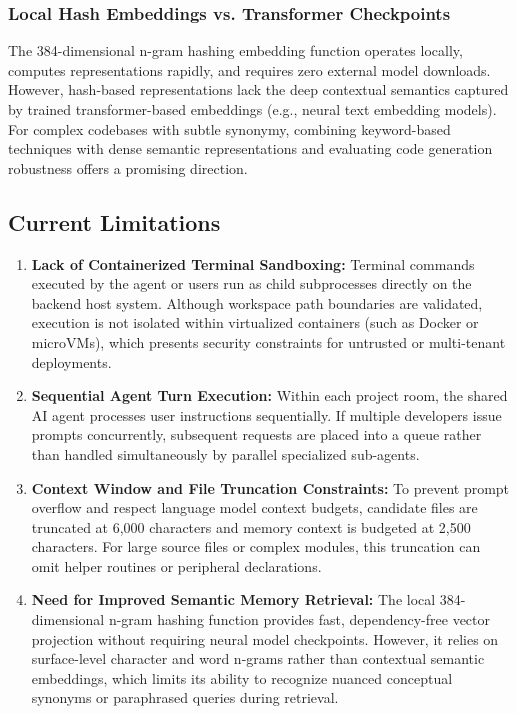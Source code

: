 \documentclass[conference]{IEEEtran}
\begin{document}
\subsubsection{Local Hash Embeddings vs. Transformer Checkpoints}
The 384-dimensional n-gram hashing embedding function operates locally, computes representations rapidly, and requires zero external model downloads. However, hash-based representations lack the deep contextual semantics captured by trained transformer-based embeddings (e.g., neural text embedding models). For complex codebases with subtle synonymy, combining keyword-based techniques with dense semantic representations and evaluating code generation robustness \cite{stutz2024evaluating} offers a promising direction.

\subsection{Current Limitations}
\begin{enumerate}
    \item \textbf{Lack of Containerized Terminal Sandboxing:} Terminal commands executed by the agent or users run as child subprocesses directly on the backend host system. Although workspace path boundaries are validated, execution is not isolated within virtualized containers (such as Docker or microVMs), which presents security constraints for untrusted or multi-tenant deployments.
    \item \textbf{Sequential Agent Turn Execution:} Within each project room, the shared AI agent processes user instructions sequentially. If multiple developers issue prompts concurrently, subsequent requests are placed into a queue rather than handled simultaneously by parallel specialized sub-agents.
    \item \textbf{Context Window and File Truncation Constraints:} To prevent prompt overflow and respect language model context budgets, candidate files are truncated at 6,000 characters and memory context is budgeted at 2,500 characters. For large source files or complex modules, this truncation can omit helper routines or peripheral declarations.
    \item \textbf{Need for Improved Semantic Memory Retrieval:} The local 384-dimensional n-gram hashing function provides fast, dependency-free vector projection without requiring neural model checkpoints. However, it relies on surface-level character and word n-grams rather than contextual semantic embeddings, which limits its ability to recognize nuanced conceptual synonyms or paraphrased queries during retrieval.
\end{enumerate}
\end{document}
